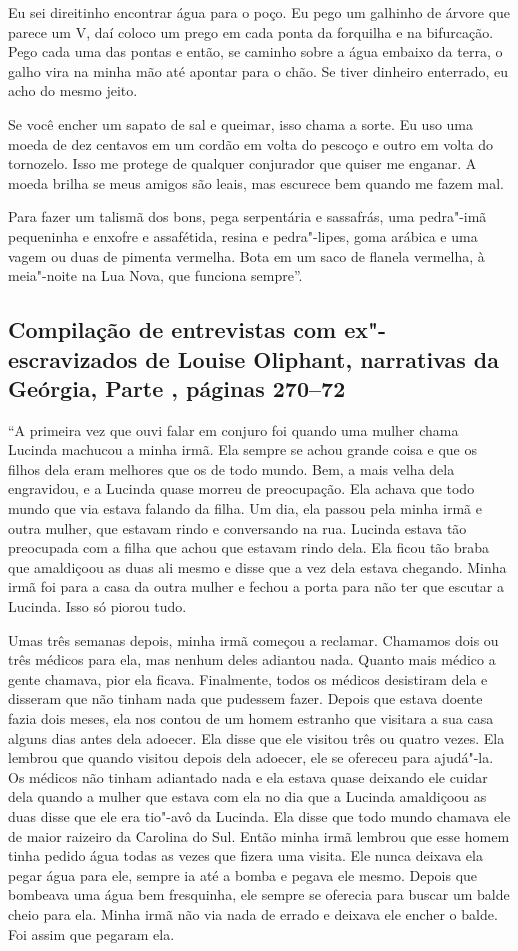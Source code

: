 Eu sei direitinho encontrar água para o poço. Eu pego um galhinho de
árvore que parece um V, daí coloco um prego em cada ponta da forquilha e
na bifurcação. Pego cada uma das pontas e então, se caminho sobre a água
embaixo da terra, o galho vira na minha mão até apontar para o chão. Se
tiver dinheiro enterrado, eu acho do mesmo jeito.

Se você encher um sapato de sal e queimar, isso chama a sorte. Eu uso
uma moeda de dez centavos em um cordão em volta do pescoço e outro em
volta do tornozelo. Isso me protege de qualquer conjurador que quiser me
enganar. A moeda brilha se meus amigos são leais, mas escurece bem quando me
fazem mal.

Para fazer um talismã dos bons, pega serpentária e sassafrás, uma
pedra"-imã pequeninha e enxofre e assafétida, resina e pedra"-lipes, goma
arábica e uma vagem ou duas de pimenta vermelha. Bota em um saco de
flanela vermelha, à meia"-noite na Lua Nova, que funciona sempre''.

\subsection{Compilação de entrevistas com ex"-escravizados de Louise Oliphant, narrativas
da Geórgia, Parte , páginas 270--72}

``A primeira vez que ouvi falar em conjuro foi quando uma mulher chama
Lucinda machucou a minha irmã. Ela sempre se achou grande coisa e que os
filhos dela eram melhores que os de todo mundo. Bem, a mais velha dela
engravidou, e a Lucinda quase morreu de preocupação. Ela achava que todo
mundo que via estava falando da filha. Um dia, ela passou pela minha
irmã e outra mulher, que estavam rindo e conversando na rua. Lucinda
estava tão preocupada com a filha que achou que estavam rindo dela. Ela
ficou tão braba que amaldiçoou as duas ali mesmo e disse que a vez
dela estava chegando. Minha irmã foi para a casa da outra mulher e
fechou a porta para não ter que escutar a Lucinda. Isso só piorou tudo.

Umas três semanas depois, minha irmã começou a reclamar. Chamamos dois
ou três médicos para ela, mas nenhum deles adiantou nada. Quanto mais
médico a gente chamava, pior ela ficava. Finalmente, todos os médicos
desistiram dela e disseram que não tinham nada que pudessem fazer.
Depois que estava doente fazia dois meses, ela nos contou de um homem
estranho que visitara a sua casa alguns dias antes dela adoecer. Ela
disse que ele visitou três ou quatro vezes. Ela lembrou que quando
visitou depois dela adoecer, ele se ofereceu para ajudá"-la. Os médicos
não tinham adiantado nada e ela estava quase deixando ele cuidar dela
quando a mulher que estava com ela no dia que a Lucinda amaldiçoou as
duas disse que ele era tio"-avô da Lucinda. Ela disse que todo mundo
chamava ele de maior raizeiro da Carolina do Sul. Então minha irmã
lembrou que esse homem tinha pedido água todas as vezes que fizera uma
visita. Ele nunca deixava ela pegar água para ele, sempre ia até a bomba
e pegava ele mesmo. Depois que bombeava uma água bem fresquinha, ele
sempre se oferecia para buscar um balde cheio para ela. Minha irmã não
via nada de errado e deixava ele encher o balde. Foi assim que pegaram
ela.

